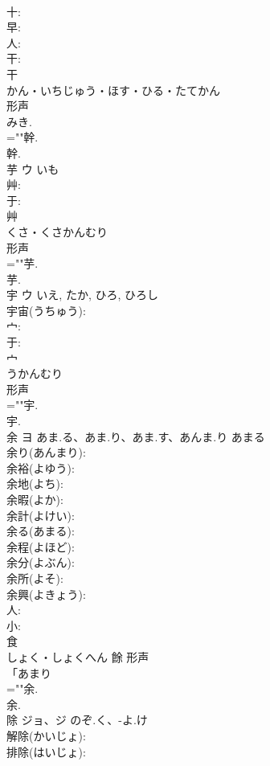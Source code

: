 \documentclass[8pt]{extreport}
\begin{document}
\begin{CJK}{UTF8}{min}
\\	十: 
\\	早: 
\\	人: 
\\	干: 
\\	干	
\\	かん・いちじゅう・ほす・ひる・たてかん	
\\	形声 
\\	みき.	
\\	=""幹.
\\	幹.
\\	芋	ウ	いも		
\\	艸: 
\\	于: 
\\	艸	
\\	くさ・くさかんむり	
\\	形声 
\\	=""芋.
\\	芋.
\\	宇	ウ		いえ, たか, ひろ, ひろし	
\\	宇宙(うちゅう): 
\\	宀: 
\\	于: 
\\	宀	
\\	うかんむり	
\\	形声 
\\	=""宇.
\\	宇.
\\	余	ヨ	あま.る、あま.り、あま.す、あんま.り	あまる	
\\	余り(あんまり): 
\\	余裕(よゆう): 
\\	余地(よち): 
\\	余暇(よか): 
\\	余計(よけい): 
\\	余る(あまる): 
\\	余程(よほど): 
\\	余分(よぶん): 
\\	余所(よそ): 
\\	余興(よきょう): 
\\	人: 
\\	小: 
\\	食	
\\	しょく・しょくへん	餘	形声 
\\	「あまり 
\\	=""余.
\\	余.
\\	除	ジョ、ジ	のぞ.く、-よ.け		
\\	解除(かいじょ): 
\\	排除(はいじょ): 

\end{CJK}
\end{document}
